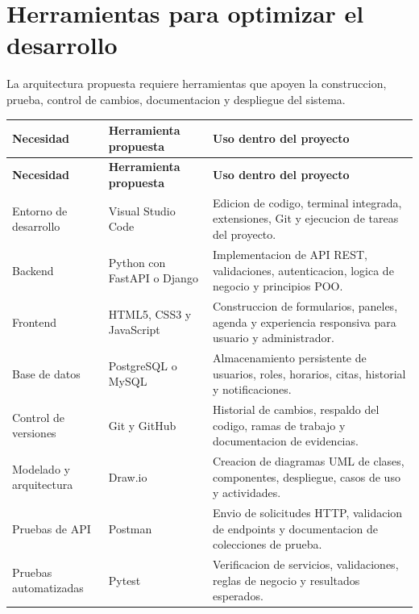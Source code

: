 \documentclass[12pt,letterpaper]{article}
\begin{document}
\section{Herramientas para optimizar el desarrollo}

La arquitectura propuesta requiere herramientas que apoyen la construccion, prueba, control de cambios, documentacion y despliegue del sistema.

\begin{longtable}{|p{3.3cm}|p{4cm}|p{6.7cm}|}
\hline
\textbf{Necesidad} & \textbf{Herramienta propuesta} & \textbf{Uso dentro del proyecto} \\
\hline
\endfirsthead
\hline
\textbf{Necesidad} & \textbf{Herramienta propuesta} & \textbf{Uso dentro del proyecto} \\
\hline
\endhead
\hline
\endfoot
\hline
\endlastfoot

Entorno de desarrollo & Visual Studio Code & Edicion de codigo, terminal integrada, extensiones, Git y ejecucion de tareas del proyecto. \\
\hline

Backend & Python con FastAPI o Django & Implementacion de API REST, validaciones, autenticacion, logica de negocio y principios POO. \\
\hline

Frontend & HTML5, CSS3 y JavaScript & Construccion de formularios, paneles, agenda y experiencia responsiva para usuario y administrador. \\
\hline

Base de datos & PostgreSQL o MySQL & Almacenamiento persistente de usuarios, roles, horarios, citas, historial y notificaciones. \\
\hline

Control de versiones & Git y GitHub & Historial de cambios, respaldo del codigo, ramas de trabajo y documentacion de evidencias. \\
\hline

Modelado y arquitectura & Draw.io & Creacion de diagramas UML de clases, componentes, despliegue, casos de uso y actividades. \\
\hline

Pruebas de API & Postman & Envio de solicitudes HTTP, validacion de endpoints y documentacion de colecciones de prueba. \\
\hline

Pruebas automatizadas & Pytest & Verificacion de servicios, validaciones, reglas de negocio y resultados esperados. \\
\hline


\end{longtable}
\end{document}
